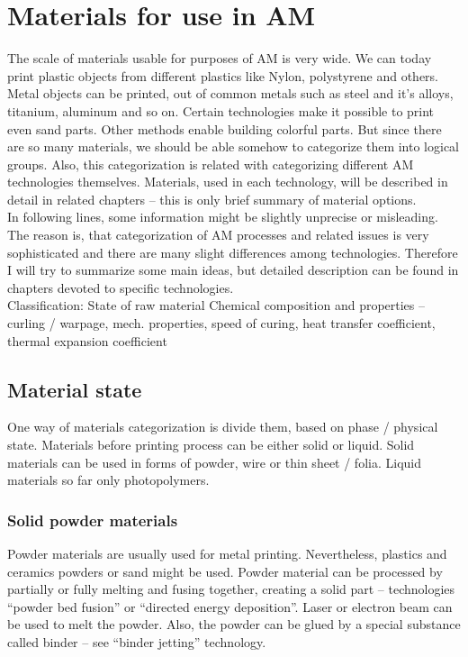 \documentclass[a4paper]{report}
\begin{document}
\chapter{Materials for use in AM}
The scale of materials usable for purposes of AM is very wide. We can today print plastic objects from different plastics like Nylon, polystyrene and others. Metal objects can be printed, out of common metals such as steel and it's alloys, titanium, aluminum and so on. Certain technologies make it possible to print even sand parts. Other methods enable building colorful parts. But since there are so many materials, we should be able somehow to categorize them into logical groups. Also, this categorization is related with categorizing different AM technologies themselves.  Materials, used in each technology, will be described in detail in related chapters – this is only brief summary of material options.\\
In following lines, some information might be slightly unprecise or misleading. The reason is, that categorization of AM processes and related issues is very sophisticated and there are many slight differences among technologies. Therefore I will try to summarize some main ideas, but detailed description can be found in chapters devoted to specific technologies.\\
Classification:
State of raw material
Chemical composition and properties – curling / warpage, mech. properties, speed of curing, heat transfer coefficient, thermal expansion coefficient\\

\section{Material state}
One way of materials categorization is divide them, based on phase / physical state. Materials before printing process can be either solid or liquid. Solid materials can be used in forms of powder, wire or thin sheet / folia. Liquid materials so far only photopolymers.
\subsection{Solid powder materials}
Powder materials are usually used for metal printing. Nevertheless, plastics and ceramics powders or sand might be used. Powder material can be processed by partially or fully melting and fusing together, creating a solid part – technologies “powder bed fusion” or “directed energy deposition”. Laser or electron beam can be used to melt the powder. Also, the powder can be glued by a special substance called binder – see “binder jetting” technology. 
\end{document}
